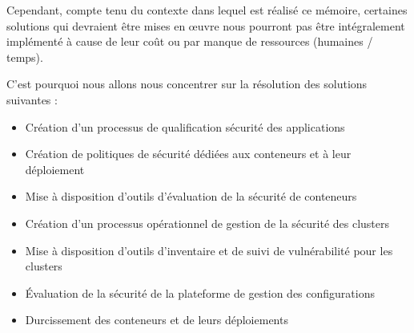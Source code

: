 Cependant, compte tenu du contexte dans lequel est réalisé ce mémoire, certaines solutions qui devraient être mises en 
œuvre nous pourront pas être intégralement implémenté à cause de leur coût ou par manque de ressources (humaines / 
temps).

C'est pourquoi nous allons nous concentrer sur la résolution des solutions suivantes : 
\begin{itemize}
    \item Création d'un processus de qualification sécurité des applications
    \item Création de politiques de sécurité dédiées aux conteneurs et à leur déploiement
    \item Mise à disposition d'outils d'évaluation de la sécurité de conteneurs
    \item Création d'un processus opérationnel de gestion de la sécurité des clusters
    \item Mise à disposition d'outils d'inventaire et de suivi de vulnérabilité pour les clusters
    \item Évaluation de la sécurité de la plateforme de gestion des configurations
    \item Durcissement des conteneurs et de leurs déploiements
\end{itemize}
